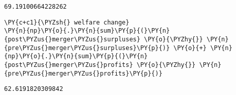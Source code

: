             \begin{tcolorbox}[breakable, size=fbox, boxrule=.5pt, pad at break*=1mm, opacityfill=0]
\begin{Verbatim}[commandchars=\\\{\}]
69.19100664228262
\end{Verbatim}
\end{tcolorbox}

    \begin{tcolorbox}[breakable, size=fbox, boxrule=1pt, pad at break*=1mm,colback=cellbackground, colframe=cellborder]
\begin{Verbatim}[commandchars=\\\{\}]
\PY{c+c1}{\PYZsh{} welfare change}
\PY{n}{np}\PY{o}{.}\PY{n}{sum}\PY{p}{(}\PY{n}{post\PYZus{}merger\PYZus{}surpluses} \PY{o}{\PYZhy{}} \PY{n}{pre\PYZus{}merger\PYZus{}surpluses}\PY{p}{)} \PY{o}{+} \PY{n}{np}\PY{o}{.}\PY{n}{sum}\PY{p}{(}\PY{n}{post\PYZus{}merger\PYZus{}profits} \PY{o}{\PYZhy{}} \PY{n}{pre\PYZus{}merger\PYZus{}profits}\PY{p}{)}
\end{Verbatim}
\end{tcolorbox}

            \begin{tcolorbox}[breakable, size=fbox, boxrule=.5pt, pad at break*=1mm, opacityfill=0]
\begin{Verbatim}[commandchars=\\\{\}]
62.6191820309842
\end{Verbatim}
\end{tcolorbox}



